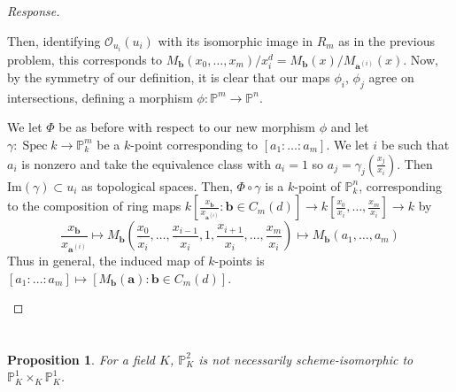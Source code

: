 \documentclass[english,letter,doublesided]{article}
\renewcommand\vec{\mathbf}
\DeclareMathOperator{\spec}{Spec}
\newcommand{\OO}{\mathcal{O}}
\newcommand{\PP}{\mathbb{P}}
\newcommand{\prob}[1]{\setcounter{section}{#1-1}\section{}}
\newtheorem*{prop*}{Proposition}
\theoremstyle{remark}
\theoremstyle{definition}
\newcommand{\im}{\mathrm{Im}}
\newcommand{\fv}[2]{\frac{x_{#1}}{x_{#2}}}
\newcommand{\va}{\vec{a}}
\newcommand{\vai}[1]{\va^{(#1)}}
\begin{document}
\begin{proof}[Response]
\begin{enumerate}[label=\textit{(\roman*)}]
	Then, identifying $\OO_{u_i}(u_i)$ with its isomorphic image in $R_m$ as in the previous problem, this corresponds to $M_{\vec{b}}(x_0,\hdots,x_m)/x_i^d=M_{\vec{b}}(x)/M_{\vec{a}^{(i)}}(x)$. Now, by the symmetry of our definition, it is clear that our maps $\phi_i$, $\phi_j$ agree on intersections, defining a morphism $\phi: \PP^m\to \PP^n$. 
	
	We let $\Phi$ be as before with respect to our new morphism $\phi$ and let $\gamma:\spec k\to \PP^m_k$ be a $k$-point corresponding to $[a_1:\hdots:a_m]$. We let $i$ be such that $a_i$ is nonzero and take the equivalence class with $a_i=1$ so $a_j=\gamma_j(\fv{j}{i})$. Then $\im(\gamma)\subset u_i$ as topological spaces. Then, $\Phi\circ \gamma$ is a $k$-point of $\PP^n_k$, corresponding to the composition of ring maps $k[\fv{\vec{b}}{\vai{i}}:\vec{b}\in C_m(d)]\to k[\fv{0}{i},\hdots,\fv{m}{i}]\to k$ by
	\begin{equation}
		\fv{\vec{b}}{\vai{i}}\mapsto M_\vec{b}\left(\fv{0}{i},\hdots,\fv{i-1}{i},1,\fv{i+1}{i},\hdots,\fv{m}{i}\right)\mapsto M_\vec{b}(a_1,\hdots,a_m)
	\end{equation}
	Thus in general, the induced map of $k$-points is $[a_1:\hdots:a_m]\mapsto [M_\vec{b}(\vec{a}):\vec{b}\in C_m(d)]$.
\end{enumerate}
\end{proof}
\prob{4}
\begin{prop*} For a field $K$, 
$\PP^2_K$ is not necessarily scheme-isomorphic to $\PP_K^1\times_{K}\PP_K^1$.
\end{prop*}
\end{document}
